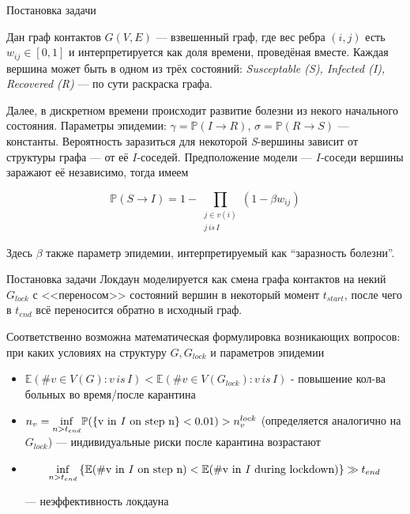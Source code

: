 	\begin{frame}{Постановка задачи}
		
		Дан граф контактов $G(V,E)$ --- взвешенный граф, где вес ребра $(i,j)$ есть $w_{ij} \in [0, 1]$ и интерпретируется как доля времени, проведёная вместе. Каждая вершина может быть в одном из трёх состояний:\textit{ Susceptable (S), Infected (I), Recovered (R)} --- по сути раскраска графа. \smallskip
		
		\pause
		
		Далее, в дискретном времени происходит развитие болезни из некого начального состояния. Параметры эпидемии: $\gamma = \mathbb{P}(I \to R)$, $\sigma = \mathbb{P}(R \to S)$ --- константы. Вероятность заразиться для некоторой \textit{S}-вершины зависит от структуры графа --- от её $I$-соседей. Предположение модели --- $I$-соседи вершины заражают её независимо, тогда имеем
		
		\begin{equation*}
			\mathbb{P}(S \to I) = 1 - \prod\limits_{\substack{j \in \mathit{v}(i) \\ j \, is \, \mathit{I}}} (1 - \beta w_{ij})
		\end{equation*}
		
		 Здесь $\beta$ также параметр эпидемии, интерпретируемый как ``заразность болезни''.
		 
	\end{frame}

	\begin{frame}{Постановка задачи}
		Локдаун моделируется как смена графа контактов на некий $G_{lock}$ с <<переносом>> состояний вершин в некоторый момент $t_{start}$, после чего в $t_{end}$ всё переносится обратно в исходный граф. \smallskip
		
		\pause
		
		Соответственно возможна математическая формулировка возникающих вопросов: при каких условиях на структуру $G, G_{lock}$ и параметров эпидемии
		
		\begin{itemize}
			\item $\mathbb{E}(\#v \in V(G): v \, is \, \mathit{I}) < \mathbb{E}(\#v \in V(G_{lock}): v \, is \, \mathit{I})$ - повышение кол-ва больных во время/после карантина
			
			\item $n_{v} =  \underset{n > t_{end}}{\inf} \mathbb{P}(\{ \text{v in \textit{I} on step n} \} < 0.01) > n_{v}^{lock} $ (определяется аналогично на $G_{lock}$) --- индивидуальные риски после карантина возрастают
			
			\item
			
			\begin{equation*}
				\underset{n > t_{end}}{\inf} \left\{ \mathbb{E}(\# \text{v in \textit{I} on step n}) < \mathbb{E}(\# \text{v in \textit{I} during lockdown}) \right\} \gg t_{end}
			\end{equation*}
			
			--- неэффективность локдауна
			
		\end{itemize}
	
	\end{frame}

